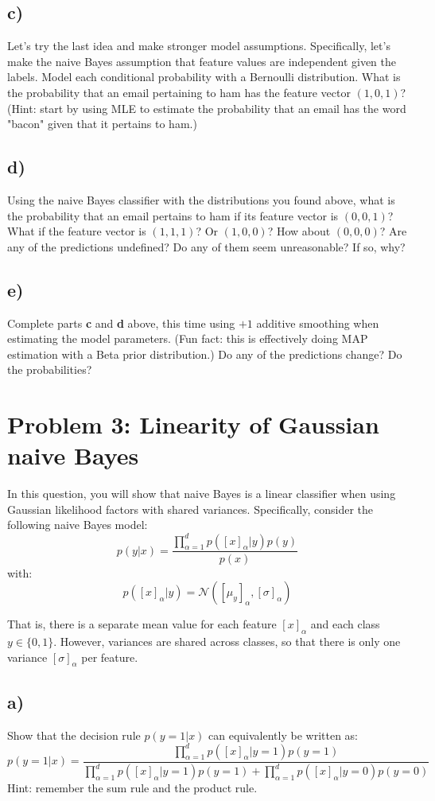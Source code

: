 \documentclass[a4paper]{article}
\begin{document}
\subsection*{c)}
Let's try the last idea and make stronger model assumptions. Specifically, let's make the naive Bayes assumption that feature values are independent given the labels. Model each conditional probability with a Bernoulli distribution. What is the probability that an email pertaining to ham has the feature vector $(1,0,1)$? (Hint: start by using MLE to estimate the probability that an email has the word "bacon" given that it pertains to ham.)
\subsection*{d)}
Using the naive Bayes classifier with the distributions you found above, what is the probability that an email pertains to ham if its feature vector is $(0,0,1)$? What if the feature vector is $(1,1,1)$? Or $(1,0,0)$? How about $(0,0,0)$? Are any of the predictions undefined? Do any of them seem unreasonable? If so, why?
\subsection*{e)}
Complete parts \textbf{c} and \textbf{d} above, this time using $+1$ additive smoothing when estimating the model parameters. (Fun fact: this is effectively doing MAP estimation with a Beta prior distribution.) Do any of the predictions change? Do the probabilities? 

\section*{Problem 3: Linearity of Gaussian naive Bayes}
In this question, you will show that naive Bayes is a linear classifier when using Gaussian likelihood factors with shared variances. Specifically, consider the following naive Bayes model:
$$p\left(y|x\right) = \frac{\prod^{d}_{\alpha=1}p\left(\left[x\right]_{\alpha}|y\right)p\left(y\right)}{p\left(x\right)}$$
with:
$$p\left(\left[x\right]_{\alpha}|y\right) = \mathcal{N}\left(\left[\mu_y\right]_{\alpha}, \left[\sigma\right]_{\alpha}\right)$$

That is, there is a separate mean value for each feature $\left[x\right]_{\alpha}$ and each class $y \in \{0, 1\}$. However, variances are shared across classes, so that there is only one variance $\left[\sigma\right]_{\alpha}$ per feature.
\subsection*{a)} 
Show that the decision rule $p(y=1|x)$ can equivalently be written as:
$$
p(y=1|x) = \frac{\prod_{\alpha=1}^{d} p([x]_{\alpha}|y=1)p(y=1)}{\prod_{\alpha=1}^{d} p([x]_{\alpha}|y=1)p(y=1)+\prod_{\alpha=1}^{d} p([x]_{\alpha}|y=0)p(y=0)}
$$
Hint: remember the sum rule and the product rule.
\end{document}
